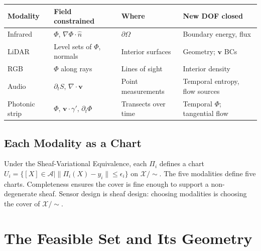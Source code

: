 \documentclass[12pt, oneside]{article}
\newcommand{\Xmod}{\mathcal{X}/{\sim}}
\begin{document}
\begin{center}
\begin{tabular}{llll}
\toprule
\textbf{Modality} & \textbf{Field constrained} & \textbf{Where} &
\textbf{New DOF closed} \\
\midrule
Infrared & $\Phi$, $\nabla\Phi \cdot \hat{n}$ & $\partial\Omega$ &
Boundary energy, flux \\
LiDAR & Level sets of $\Phi$, normals & Interior surfaces &
Geometry; $\mathbf{v}$ BCs \\
RGB & $\Phi$ along rays & Lines of sight &
Interior density \\
Audio & $\partial_t S$, $\nabla \cdot \mathbf{v}$ & Point measurements &
Temporal entropy, flow sources \\
Photonic strip & $\Phi$, $\mathbf{v} \cdot \gamma'$, $\partial_t \Phi$ &
Transects over time & Temporal $\Phi$; tangential flow \\
\bottomrule
\end{tabular}
\end{center}

\subsection{Each Modality as a Chart}

Under the Sheaf-Variational Equivalence, each $\Pi_i$ defines a chart
$U_i = \{[X] \in \mathcal{A} \mid \|\Pi_i(X) - y_i\| \le \epsilon_i\}$ on $\Xmod$.
The five modalities define five charts. Completeness ensures the cover is fine enough
to support a non-degenerate sheaf. Sensor design is sheaf design: choosing modalities
is choosing the cover of $\Xmod$.

\section{The Feasible Set and Its Geometry}
\label{sec:feasible}
\end{document}

